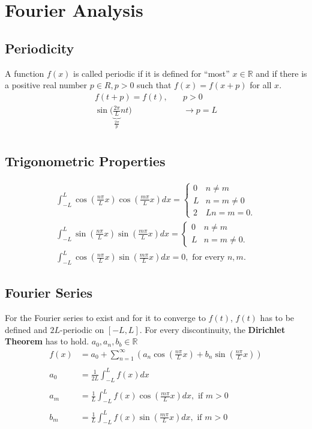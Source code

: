 \section{Fourier Analysis}

\subsection{Periodicity}
A function $f(x)$ is called periodic if it is defined for “most” $x \in \mathbb{R} $ and if there is a positive real number $p \in R, p > 0$ such that $f(x) = f(x+p)$ for all $x$.
\begin{align*}
    f(t+p)=f(t),\quad                                                  & p>0             \\
    \sin\biggl( \underbrace{\frac{2\pi}{L}}_{\frac{2\pi}{p}}nt \biggr) & \rightarrow p=L \\
\end{align*}

\subsection{Trigonometric Properties}
\begin{align*}
    \int_{-L}^L\cos\left(\frac{n\pi}Lx\right)\cos\left(\frac{m\pi}Lx\right)dx=\begin{cases}0&n\neq m\\L&n=m\neq0\\2&Ln=m=0.\end{cases} \\
    \int_{-L}^L\sin\left(\frac{n\pi}Lx\right)\sin\left(\frac{m\pi}Lx\right)dx=\begin{cases}0&n\neq m\\L&n=m\neq0.\end{cases}           \\
    \int_{-L}^L\cos\left(\frac{n\pi}Lx\right)\sin\left(\frac{m\pi}Lx\right)dx=0,\text{ for every }n,m.
\end{align*}

\subsection{Fourier Series}
For the Fourier series to exist and for it to converge to $f(t)$, $f(t)$ has to be defined and $2L$-periodic on $[-L,L]$.
For every discontinuity, the \textbf{Dirichlet Theorem} has to hold. $a_0,a_n,b_b\in \mathbb{R}$
\begin{align*}
    f(x)  & =a_0+\sum_{n=1}^\infty\left(a_n\cos\left(\frac{n\pi}Lx\right)+b_n\sin\left(\frac{n\pi}Lx\right)\right) \\ \\
    a_{0} & =\frac{1}{2L}\int_{-L}^{L}f(x)dx                                                                       \\ \\
    a_{m} & =\frac{1}{L}\int_{-L}^{L}f(x)\cos\left(\frac{m\pi}{L}x\right)dx,\text{ if }m>0                         \\ \\
    b_{m} & =\frac{1}{L}\int_{-L}^{L}f(x)\sin\left(\frac{m\pi}{L}x\right)dx,\text{ if }m>0
\end{align*}
